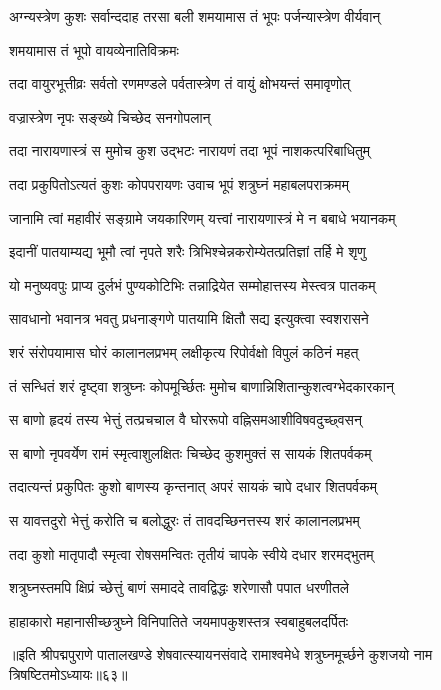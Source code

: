 \twolineshloka
{अग्न्यस्त्रेण कुशः सर्वान्ददाह तरसा बली}
{शमयामास तं भूपः पर्जन्यास्त्रेण वीर्यवान्}%

शमयामास तं भूपो वायव्येनातिविक्रमः

\twolineshloka
{तदा वायुरभूत्तीव्रः सर्वतो रणमण्डले}
{पर्वतास्त्रेण तं वायुं क्षोभयन्तं समावृणोत्}%

वज्रास्त्रेण नृपः सङ्ख्ये चिच्छेद सनगोपलान्

\twolineshloka
{तदा नारायणास्त्रं स मुमोच कुश उद्भटः}
{नारायणं तदा भूपं नाशकत्परिबाधितुम्}%

\twolineshloka
{तदा प्रकुपितोऽत्यतं कुशः कोपपरायणः}
{उवाच भूपं शत्रुघ्नं महाबलपराक्रमम्}%

\twolineshloka
{जानामि त्वां महावीरं सङ्ग्रामे जयकारिणम्}
{यत्त्वां नारायणास्त्रं मे न बबाधे भयानकम्}%

\twolineshloka
{इदानीं पातयाम्यद्य भूमौ त्वां नृपते शरैः}
{त्रिभिश्चेन्नकरोम्येतत्प्रतिज्ञां तर्हि मे शृणु}%

\twolineshloka
{यो मनुष्यवपुः प्राप्य दुर्लभं पुण्यकोटिभिः}
{तन्नाद्रियेत सम्मोहात्तस्य मेस्त्वत्र पातकम्}%

\twolineshloka
{सावधानो भवानत्र भवतु प्रधनाङ्गणे}
{पातयामि क्षितौ सद्य इत्युक्त्वा स्वशरासने}%

\twolineshloka
{शरं संरोपयामास घोरं कालानलप्रभम्}
{लक्षीकृत्य रिपोर्वक्षो विपुलं कठिनं महत्}%

\twolineshloka
{तं सन्धितं शरं दृष्ट्वा शत्रुघ्नः कोपमूर्च्छितः}
{मुमोच बाणान्निशितान्कुशत्वग्भेदकारकान्}%

\twolineshloka
{स बाणो हृदयं तस्य भेत्तुं तत्प्रचचाल वै}
{घोररूपो वह्निसमआशीविषवदुच्छ्वसन्}%

\twolineshloka
{स बाणो नृपवर्येण रामं स्मृत्वाशुलक्षितः}
{चिच्छेद कुशमुक्तं स सायकं शितपर्वकम्}%

\twolineshloka
{तदात्यन्तं प्रकुपितः कुशो बाणस्य कृन्तनात्}
{अपरं सायकं चापे दधार शितपर्वकम्}%

\twolineshloka
{स यावत्तदुरो भेत्तुं करोति च बलोद्धुरः}
{तं तावदच्छिनत्तस्य शरं कालानलप्रभम्}%

\twolineshloka
{तदा कुशो मातृपादौ स्मृत्वा रोषसमन्वितः}
{तृतीयं चापके स्वीये दधार शरमद्भुतम्}%

\twolineshloka
{शत्रुघ्नस्तमपि क्षिप्रं च्छेत्तुं बाणं समाददे}
{तावद्विद्धः शरेणासौ पपात धरणीतले}%

\twolineshloka
{हाहाकारो महानासीच्छत्रुघ्ने विनिपातिते}
{जयमापकुशस्तत्र स्वबाहुबलदर्पितः}%

॥इति श्रीपद्मपुराणे पातालखण्डे शेषवात्स्यायनसंवादे रामाश्वमेधे शत्रुघ्नमूर्च्छने कुशजयो नाम त्रिषष्टितमोऽध्यायः॥६३॥

